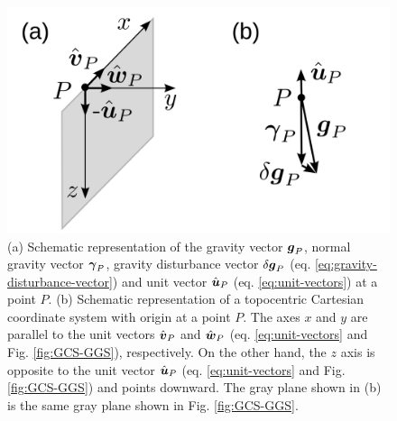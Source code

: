 \documentclass[extra]{gji}
\begin{document}
\begin{figure}
    \includegraphics{figures/local-system.png}
    \caption{(a) Schematic representation of the gravity vector
    $\mitbf{g}_{P}$, normal gravity vector $\mitbf{\gamma}_{P}$,
    gravity disturbance vector $\delta \mitbf{g}_{P}$
    (eq. \ref{eq:gravity-disturbance-vector}) and unit vector
    $\hat{\mitbf{u}}_{P}$ (eq. \ref{eq:unit-vectors}) at a point
    $P$.
    (b) Schematic representation of a topocentric Cartesian
    coordinate system with origin at a point $P$. The axes $x$
    and $y$ are parallel to the unit vectors $\hat{\mitbf{v}}_{P}$
    and $\hat{\mitbf{w}}_{P}$ (eq. \ref{eq:unit-vectors} and
    Fig. \ref{fig:GCS-GGS}), respectively. On the other hand, the $z$ axis is opposite to the unit vector $\hat{\mitbf{u}}_{P}$ (eq.
    \ref{eq:unit-vectors} and Fig. \ref{fig:GCS-GGS}) and points downward. The gray plane shown in (b) is the same gray plane
    shown in Fig. \ref{fig:GCS-GGS}.}
  \label{fig:TCS}
\end{figure}
\end{document}

